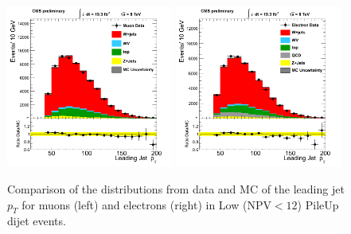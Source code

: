 \begin{figure}[h!t]
  {\centering
    \includegraphics[width=0.49\textwidth]{figs/puchecks/mu_LowNPV_jetld_pt.png}
    \includegraphics[width=0.49\textwidth]{figs/puchecks/el_LowNPV_jetld_pt.png}
    \caption{Comparison of the distributions from data and MC of the
    leading jet $p_T$ for muons (left) and electrons (right)
    in Low (NPV$<12$) PileUp dijet events.}
\label{fig:pu_jetldLow}}
\end{figure}
